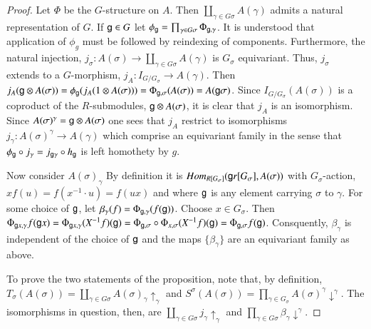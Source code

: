 \begin{proof}
Let $\Phi$ be the $G$-structure on $A$. Then $\coprod_{\gamma \in G\sigma} A(\gamma)$ admits a natural representation of $G$. If $\mathsf{g} \in G$  let $\phi_{\mathsf{g}} = \prod_{\gamma \in G\sigma} \Phi_{\mathsf{g},\gamma}$. It is understood that application of $\phi_{g}$ must be followed by reindexing of components. Furthermore, the natural injection, $j_{\sigma} : A(\sigma) \rightarrow \coprod_{\gamma \in G\sigma} A(\gamma)$ is $G_{\sigma}$ equivariant. Thus, $j_{\sigma}$ extends to a $G$-morphism, $j_{A} : I_{G/G_{\sigma}} \rightarrow A(\gamma)$. Then $j_{A}(\mathsf{g} \otimes A(\sigma)) = \phi_{\mathsf{g}}(j_{A}(1 \otimes A(\sigma))) =\Phi_{\mathsf{g}, \sigma}(A(\sigma))= A(\mathsf{g}\sigma)$. Since $I_{G/G_{\sigma}}(A(\sigma))$ is a coproduct of the $R$-submodules, $\mathsf{g} \otimes A(\sigma)$, it is clear that $j_{A}$ is an isomorphism. Since $A(\sigma)^{\gamma} = \mathsf{g} \otimes A(\sigma)$ one sees that $j_{A}$ restrict to isomorphisms $j_{\gamma} : A(\sigma)^{\gamma} \rightarrow A(\gamma)$ which comprise an equivariant family in the sense that $\phi_{\mathsf{g}} \circ j_{\gamma} = j_{\mathsf{g} \gamma} \circ h_{\mathsf{g}}$ is left homothety by $g$.

Now consider $A(\sigma)_{\gamma}$ By definition it is $Hom_{R[G_{\sigma}]}(\mathsf{g} r[G_{\sigma}], A(\sigma))$ with $G_{\sigma}$-action, $xf(u) = f(x^{-1} \cdot u) = f(ux)$ and where $\mathsf{g}$ is any element carrying $\sigma$ to $\gamma$. For some choice of $\mathsf{g}$, let $\beta_{\gamma}(f) = \Phi_{\mathsf{g}, \gamma}(f(\mathsf{g}))$. Choose $x\in G_{\sigma}$. Then  $\Phi_{\mathsf{g} x, \gamma}f(\mathsf{g} x) = \Phi_{\mathsf{g} x, \gamma}(X^{-1} f)(\mathsf{g}) = \Phi_{\mathsf{g}, \sigma} \circ \Phi_{x, \sigma}(X^{-1} f)(\mathsf{g}) = \Phi_{\mathsf{g}, \sigma}f(\mathsf{g})$. Consquently, $\beta_{\gamma}$ is independent of the choice of $\mathsf{g}$ and the maps $\{\beta_{\gamma}\}$ are an equivariant family as above.

To prove the two statements of the proposition, note that, by definition, $T_{\sigma}(A(\sigma))= \coprod_{\gamma \in G\sigma} A(\sigma)_{\gamma} \uparrow_{\gamma}$ and $S^{\sigma}(A(\sigma)) = \prod_{\gamma \in G_{\sigma}}A(\sigma)^{\gamma} \downarrow^{\gamma}$. The isomorphisms in question, then, are $\coprod_{\gamma \in G\sigma}j_{\gamma} \uparrow_{\gamma}$ and $\prod_{\gamma \in G\sigma}\beta_{\gamma}\downarrow^{\gamma}$.
\end{proof}

